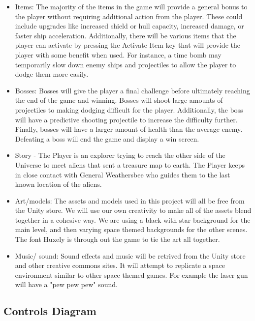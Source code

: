 \documentclass[12pt]{article}       %
\begin{document}
\begin{itemize}
\item Items: The majority of the items in the game will provide a general bonus to the player without requiring additional action from the player. These could include upgrades like increased shield or hull capacity, increased damage, or faster ship acceleration. Additionally, there will be various items that the player can activate by pressing the Activate Item key that will provide the player with some benefit when used. For instance, a time bomb may temporarily slow down enemy ships and projectiles to allow the player to dodge them more easily.

\item Bosses: Bosses will give the player a final challenge before ultimately reaching the end of the game and winning. Bosses will shoot large amounts of projectiles to making dodging difficult for the player. Additionally, the boss will have a predictive shooting projectile to increase the difficulty further. Finally, bosses will have a larger amount of health than the average enemy. Defeating a boss will end the game and display a win screen.

\item Story - The Player is an explorer trying to reach the other side of the Universe to meet aliens that sent a treasure map to earth. The Player keeps in close contact with General Weathersbee who guides them to the last known location of the aliens. 

\item Art/models: The assets and models used in this project will all be free from the Unity store. We will use our own creativity to make all of the assets blend together in a cohesive way. We are using a black with star background for the main level, and then varying space themed backgrounds for the other scenes. The font Huxely is through out the game to tie the art all together.  

\item Music/ sound: Sound effects and music will be retrived from the Unity store and other creative commons sites. It will attempt to replicate a space environment similar to other space themed games. For example the laser gun will have a "pew pew pew" sound. 

\end{itemize}

\subsection{Controls Diagram}
\end{document}
